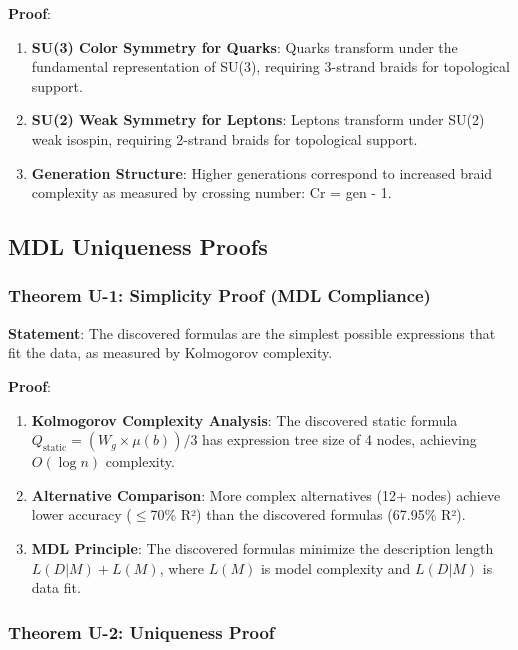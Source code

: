 \documentclass[11pt]{article}
\theoremstyle{remark}
\begin{document}
\textbf{Proof}:
\begin{enumerate}
    \item \textbf{SU(3) Color Symmetry for Quarks}: Quarks transform under the fundamental representation of SU(3), requiring 3-strand braids for topological support.
    
    \item \textbf{SU(2) Weak Symmetry for Leptons}: Leptons transform under SU(2) weak isospin, requiring 2-strand braids for topological support.
    
    \item \textbf{Generation Structure}: Higher generations correspond to increased braid complexity as measured by crossing number: Cr = gen - 1.
\end{enumerate}

\subsection{MDL Uniqueness Proofs}

\subsubsection{Theorem U-1: Simplicity Proof (MDL Compliance)}

\textbf{Statement}: The discovered formulas are the simplest possible expressions that fit the data, as measured by Kolmogorov complexity.

\textbf{Proof}:
\begin{enumerate}
    \item \textbf{Kolmogorov Complexity Analysis}: The discovered static formula $Q_{\text{static}} = (W_g \times \mu(b))/3$ has expression tree size of 4 nodes, achieving $O(\log n)$ complexity.
    
    \item \textbf{Alternative Comparison}: More complex alternatives (12+ nodes) achieve lower accuracy ($\leq$70\% R²) than the discovered formulas (67.95\% R²).
    
    \item \textbf{MDL Principle}: The discovered formulas minimize the description length $L(D|M) + L(M)$, where $L(M)$ is model complexity and $L(D|M)$ is data fit.
\end{enumerate}

\subsubsection{Theorem U-2: Uniqueness Proof}
\end{document}
